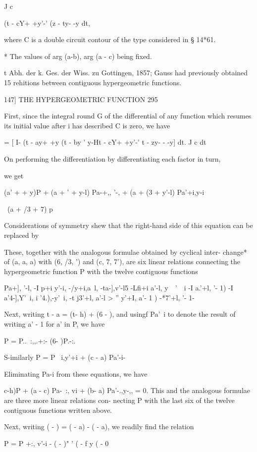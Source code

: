 J c

(t - cY+ +y'-' (z - ty- -y dt,

where C is a double circuit contour of the type considered in § 14*61.

* The values of arg (a-b), arg (a - c) being fixed.

t Abh. der k. Ges. der Wiss. zu Gottingen, 1857; Gauss had previously
obtained 15 rehitions between contiguous hypergeometric functions.

147] THE HYPERGEOMETRIC FUNCTION 295

First, since the integral round G of the differential of any function
which resumes its initial value after i has described C is zero, we
have

= [ I- (t - ay+ +y (t - by ' y-Ht - cY+ +y'-' t - zy- - -y] dt. J c dt

On performing the differentiation by differentiating each factor in
turn,

we get

(a' + + y)P + (a + ' + y-l) Pa-+,, '-, + (a + (3 + y'-l) Pa'+i,y-i

\ (a + /3 + 7) p

Considerations of symmetry shew that the right-hand side of this
equation can be replaced by

These, together with the analogous formulae obtained by cyclical
inter- change* of (a, a, a) with (6, /3, ') and (c, 7, 7'), are six
linear relations connecting the hypergeometric function P with the
twelve contiguous functions

Pa+], '-l, -I p+i y'-i, -/y+i,a\ l, -ta-],v'-l5 -Lfi+i a'-l, y~\, '~\
i -I a.'+l, '- 1) -I a'4-],Y'\ i, i '4.),-y'\ i, -t j3'+l, a'-l > ''
y'+I, a'- 1 ) -*7'+l, '- 1-

Next, writing t - a = (t- h) + (6 - ), and usingf Pa'\ i to denote the
result of writing a' - 1 for a' in P, we have

P = P..\ :,,.+:- (6- )P.-:.

S-imilarly P = P \ i,y'+i + (c - a) Pa'-i-

Eliminating Pa-i from these equations, we have

 c-h)P + (a - c) Pa-\ :, vi + (b- a) Pa'-.,y-,, = 0. This and the
analogous formulae are three more linear relations con- necting P with
the last six of the twelve contiguous functions written above.

Next, writing ( - ) = ( - a) - ( - a), we readily find the relation

P = P +:, v'-i - ( - )" ' ( - f y ( - 0

